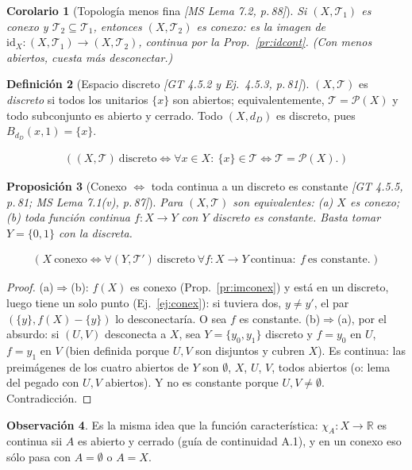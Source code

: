 \documentclass[11pt,a4paper]{article}
\newcommand{\lgc}[1]{\par\vspace{-3pt}\begin{gather*}\big(\;#1\;\big)\end{gather*}\vspace{-6pt}}
\theoremstyle{definition}
\newtheorem{definicion}{Definición}[section]
\newtheorem{observacion}[definicion]{Observación}
\theoremstyle{plain}
\newtheorem{proposicion}[definicion]{Proposición}
\newtheorem{corolario}[definicion]{Corolario}
\newcommand{\fnt}[1]{{\normalfont\small\itshape\color{gray!150!black}[#1]}}
\newcommand{\R}{\mathbb{R}}
\newcommand{\tp}{\mathcal{T}}
\begin{document}
\begin{corolario}[Topología menos fina \fnt{MS Lema 7.2, p.\,88}]
Si $(X,\tp_1)$ es conexo y $\tp_2\subseteq\tp_1$, entonces $(X,\tp_2)$ es conexo: es la imagen de $\mathrm{id}_X:(X,\tp_1)\to(X,\tp_2)$, continua por la Prop.~\ref{pr:idcont}. (Con menos abiertos, cuesta más desconectar.)
\end{corolario}

\begin{definicion}[Espacio discreto \fnt{GT 4.5.2 y Ej.\ 4.5.3, p.\,81}]
$(X,\tp)$ es \emph{discreto} si todos los unitarios $\{x\}$ son abiertos; equivalentemente, $\tp=\mathcal P(X)$ y todo subconjunto es abierto y cerrado. Todo $(X,d_D)$ es discreto, pues $B_{d_D}(x,1)=\{x\}$.
\lgc{(X,\tp)\ \text{discreto}\iff \forall x\in X:\ \{x\}\in\tp\iff \tp=\mathcal P(X).}
\end{definicion}

\begin{proposicion}[Conexo $\iff$ toda continua a un discreto es constante \fnt{GT 4.5.5, p.\,81; MS Lema 7.1(v), p.\,87}]\label{pr:conexdisc}
Para $(X,\tp)$ son equivalentes: (a) $X$ es conexo; (b) toda función continua $f:X\to Y$ con $Y$ discreto es constante. Basta tomar $Y=\{0,1\}$ con la discreta.
\lgc{X\ \text{conexo}\iff \forall (Y,\tp')\ \text{discreto}\ \forall f:X\to Y\ \text{continua}:\ f\ \text{es constante}.}
\end{proposicion}

\begin{proof}
(a)$\Rightarrow$(b): $f(X)$ es conexo (Prop.~\ref{pr:imconex}) y está en un discreto, luego tiene un solo punto (Ej.~\ref{ej:conex}): si tuviera dos, $y\ne y'$, el par $(\{y\},f(X)-\{y\})$ lo desconectaría. O sea $f$ es constante.
(b)$\Rightarrow$(a), por el absurdo: si $(U,V)$ desconecta a $X$, sea $Y=\{y_0,y_1\}$ discreto y $f=y_0$ en $U$, $f=y_1$ en $V$ (bien definida porque $U,V$ son disjuntos y cubren $X$). Es continua: las preimágenes de los cuatro abiertos de $Y$ son $\emptyset$, $X$, $U$, $V$, todos abiertos (o: lema del pegado con $U,V$ abiertos). Y no es constante porque $U,V\ne\emptyset$. Contradicción.
\end{proof}

\begin{observacion}
Es la misma idea que la función característica: $\chi_A:X\to\R$ es continua sii $A$ es abierto y cerrado (guía de continuidad A.1), y en un conexo eso sólo pasa con $A=\emptyset$ o $A=X$.
\end{observacion}
\end{document}
